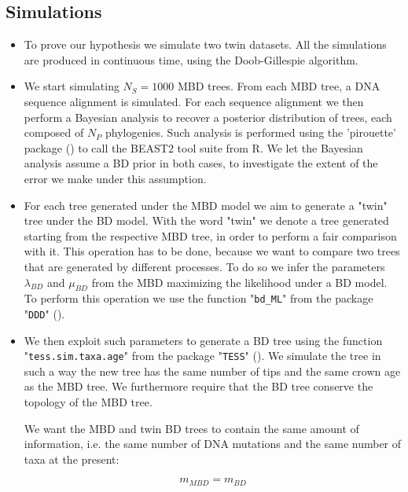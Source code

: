 \documentclass{article}
\begin{document}
\subsection{Simulations}
\begin{itemize}

\item To prove our hypothesis we simulate two twin datasets. 
All the simulations are produced in continuous time, 
using the Doob-Gillespie algorithm. 

\item We start simulating $N_{S} = 1000$ MBD trees. 
From each MBD tree, a DNA sequence alignment is simulated. 
For each sequence alignment we then perform a Bayesian analysis 
to recover a posterior distribution of trees, 
each composed of $N_{P}$ phylogenies. 
Such analysis is performed using 
the 'pirouette' package (\cite{pirouette}) to call the BEAST2 tool 
suite from R. 
We let the Bayesian analysis assume a BD prior in both cases, 
to investigate the extent of the error we make under this assumption.

\item For each tree generated under the MBD model 
we aim to generate a "twin" tree under the BD model. 
With the word "twin" 
we denote a tree generated starting from the respective MBD tree, 
in order to perform a fair comparison with it. 
This operation has to be done, 
because we want to compare two trees 
that are generated by different processes. 
To do so we infer the parameters $\lambda_{BD}$ and $\mu_{BD}$ 
from the MBD maximizing the likelihood under a BD model. 
To perform this operation we use the function "\texttt{bd\_ML}" 
from the package "\texttt{DDD}" (\cite{etienne2012diversity}). 

\item We then exploit such parameters to generate a BD tree 
using the function "\texttt{tess.sim.taxa.age}" 
from the package "\texttt{TESS}" (\cite{Hoehna2013}). 
We simulate the tree in such a way the new tree 
has the same number of tips and the same crown age as the MBD tree. 
We furthermore require that the BD tree conserve the topology of the MBD tree.

We want the MBD and twin BD trees to contain the same amount of information, 
i.e. the same number of DNA mutations and the same number of taxa at the present:

\begin{equation}
m_{MBD} = m_{BD} \label{m equivalence}
\end{equation} 


\end{itemize}
\end{document}
